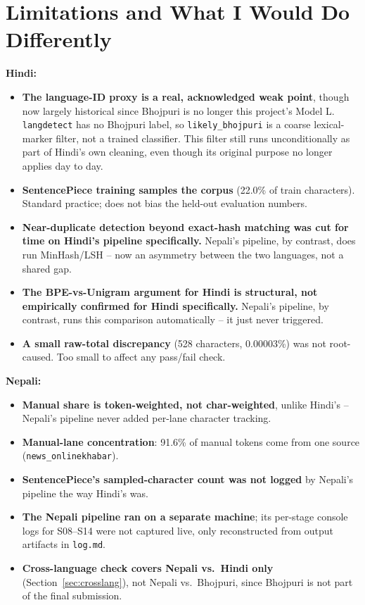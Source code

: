 \documentclass[11pt]{article}
\begin{document}
\section{Limitations and What I Would Do Differently}
\label{sec:limitations}

\textbf{Hindi:}
\begin{itemize}
\item \textbf{The language-ID proxy is a real, acknowledged weak point},
though now largely historical since Bhojpuri is no longer this project's
Model L. \texttt{langdetect} has no Bhojpuri label, so
\texttt{likely\_bhojpuri} is a coarse lexical-marker filter, not a
trained classifier. This filter still runs unconditionally as part of
Hindi's own cleaning, even though its original purpose no longer applies
day to day.
\item \textbf{SentencePiece training samples the corpus} (22.0\% of
train characters). Standard practice; does not bias the held-out
evaluation numbers.
\item \textbf{Near-duplicate detection beyond exact-hash matching was cut
for time on Hindi's pipeline specifically.} Nepali's pipeline, by
contrast, does run MinHash/LSH -- now an asymmetry between the two
languages, not a shared gap.
\item \textbf{The BPE-vs-Unigram argument for Hindi is structural, not
empirically confirmed for Hindi specifically.} Nepali's pipeline, by
contrast, runs this comparison automatically -- it just never triggered.
\item \textbf{A small raw-total discrepancy} (528 characters, 0.00003\%)
was not root-caused. Too small to affect any pass/fail check.
\end{itemize}

\textbf{Nepali:}
\begin{itemize}
\item \textbf{Manual share is token-weighted, not char-weighted}, unlike
Hindi's -- Nepali's pipeline never added per-lane character tracking.
\item \textbf{Manual-lane concentration}: 91.6\% of manual tokens come
from one source (\texttt{news\_onlinekhabar}).
\item \textbf{SentencePiece's sampled-character count was not logged} by
Nepali's pipeline the way Hindi's was.
\item \textbf{The Nepali pipeline ran on a separate machine}; its
per-stage console logs for S08--S14 were not captured live, only
reconstructed from output artifacts in \texttt{log.md}.
\item \textbf{Cross-language check covers Nepali vs.\ Hindi only}
(Section~\ref{sec:crosslang}), not Nepali vs.\ Bhojpuri, since Bhojpuri is
not part of the final submission.
\end{itemize}
\end{document}
